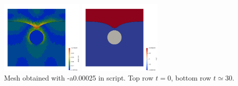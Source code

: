 \begin{center}
\includegraphics[width=4cm]{python_codes/fieldstone_93/results/sr_0136}
\includegraphics[width=4cm]{python_codes/fieldstone_93/results/mat_0136}\\
{\captionfont  Mesh obtained with -a0.00025 in script. Top row $t=0$, 
bottom row $t\simeq 30$.}
\end{center}


\newpage

